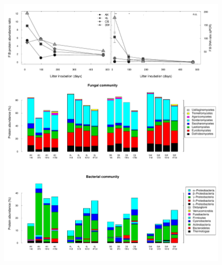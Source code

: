\documentclass[10pt]{article}
\begin{document}
\begin{flushleft}
\newpage
\begin{figure}[h!]
\vspace*{2mm}
\begin{center}
\includegraphics{ligpaper-metaprot2}
\end{center}
\end{figure}



\end{flushleft}
\end{document}

